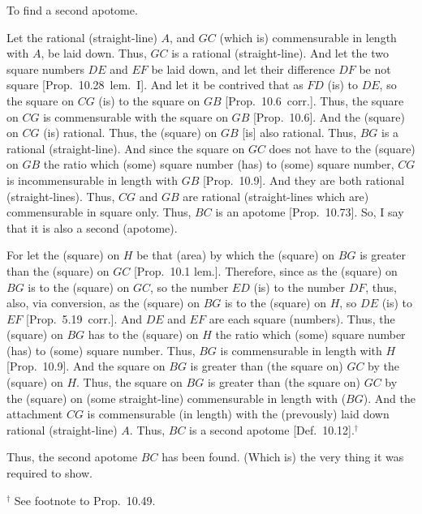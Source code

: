 \begin{Parallel}{}{}
{To find a second apotome.

Let the rational (straight-line) $A$, and $GC$ (which is)
commensurable in length with $A$, be laid down. Thus, $GC$ is a rational (straight-line).
And let the two square numbers $DE$ and $EF$ be laid down, and let
their
difference $DF$ be not square [Prop.~10.28~lem.~I]. 
And let it be contrived that as $FD$ (is) to $DE$, so the square on $CG$ (is) to the square on $GB$ [Prop.~10.6~corr.].
Thus, the square on $CG$ is commensurable with the square on $GB$ [Prop.~10.6]. And the (square) on $CG$ (is) rational.
Thus, the (square) on $GB$ [is] also rational. Thus, $BG$ is a rational
(straight-line).  And since the square on $GC$ does not have to the
(square) on $GB$ the ratio which (some) square number (has) to
(some) square number, $CG$ is incommensurable in length with $GB$
[Prop.~10.9]. And they are both rational (straight-lines). Thus, $CG$ and $GB$ are rational (straight-lines which are)
commensurable in square only. Thus, $BC$ is an apotome [Prop.~10.73]. So, I say that it is also a second
(apotome).

\epsfysize=0.65in
\centerline{}

For let the (square) on $H$ be that (area) by which the (square) on $BG$
is greater than the (square) on $GC$ [Prop.~10.1 lem.]. Therefore, since
as the (square) on $BG$ is to the (square) on $GC$, so the number $ED$
(is) to the number $DF$, thus, also, via conversion, as the (square) on $BG$
is to the (square) on $H$, so $DE$ (is) to $EF$ [Prop.~5.19~corr.]. And $DE$ and $EF$ are each
square (numbers). Thus, the (square) on $BG$ has to the (square)
on $H$ the ratio which (some) square number (has) to (some) square number.
Thus, $BG$ is commensurable in length with $H$ [Prop.~10.9]. 
And the square on $BG$ is greater than (the square on) $GC$ by the (square)
on $H$.
Thus, the square on $BG$ is greater
than (the square on) $GC$ by the (square) on (some straight-line)
commensurable in length with ($BG$). And the attachment $CG$
is commensurable (in length) with the (prevously) laid down rational (straight-line) $A$.
Thus, $BC$ is a second apotome [Def.~10.12].$^\dag$

Thus, the second apotome $BC$ has been found. (Which is) the very thing
it was required to show.}
\end{Parallel}
{\footnotesize\noindent$^\dag$ See footnote to Prop.~10.49.}


